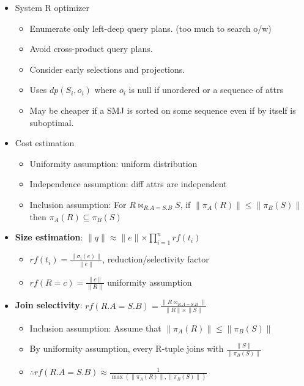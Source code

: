 \documentclass[9pt, landscape]{extarticle}
\begin{document}
\begin{multicols*}{4}
\begin{itemize}
    \item System R optimizer
    \begin{itemize}
      \item Enumerate only left-deep query plans. (too much to search o/w)
      \item Avoid cross-product query plans.
      \item Consider early selections and projections.
      \item Uses $dp(S_i, o_i)$ where $o_i$ is null if unordered or a sequence of attrs
      \item May be cheaper if a SMJ is sorted on some sequence even if by itself is suboptimal. 
    \end{itemize}
    \item Cost estimation
    \begin{itemize}
      \item Uniformity assumption: uniform distribution
      \item Independence assumption: diff attrs are independent
      \item Inclusion assumption: For $R \bowtie_{R.A = S.B} S$, if $\lVert{\pi_A (R)}\lVert \leq \lVert{\pi_B (S)}\lVert$ then $\pi_A (R) \subseteq \pi_B(S)$
    \end{itemize}
    \item \textbf{Size estimation}: $\lVert q \lVert \approx \lVert e \lVert \times \prod_{i=1}^{n}rf(t_i)$
    \begin{itemize}
      \item $rf(t_i) = \frac{\lVert \sigma_i(e)\lVert}{\lVert e \lVert}$, reduction/selectivity factor
      \item $rf(R=c) = \frac{\lVert c \lVert}{\lVert R \lVert}$ uniformity assumption
    \end{itemize}
    \item \textbf{Join selectivity}: $rf(R.A = S.B) = \frac{\lVert R \bowtie_{R.A = S.B} \lVert}{\lVert R \lVert \times \lVert S \lVert}$
    \begin{itemize}
      \item Inclusion assumption: Assume that $\lVert \pi_A(R) \lVert \leq \lVert \pi_B(S) \lVert$
      \item By uniformity assumption, every R-tuple joins with $\frac{\lVert S \lVert}{\lVert \pi_B(S) \lVert}$
      \item $\therefore rf(R.A = S.B) \approx \frac{1}{\max(\lVert \pi_A(R) \lVert, \lVert \pi_B(S) \lVert)}$ 
    \end{itemize}

\end{itemize}
\end{multicols*}
\end{document}
